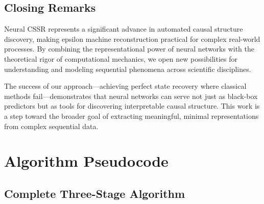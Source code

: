 \documentclass[11pt,a4paper]{report}
\theoremstyle{definition}
\begin{document}
\section{Closing Remarks}
\label{sec:closing}

Neural CSSR represents a significant advance in automated causal structure discovery, making epsilon machine reconstruction practical for complex real-world processes. By combining the representational power of neural networks with the theoretical rigor of computational mechanics, we open new possibilities for understanding and modeling sequential phenomena across scientific disciplines.

The success of our approach—achieving perfect state recovery where classical methods fail—demonstrates that neural networks can serve not just as black-box predictors but as tools for discovering interpretable causal structure. This work is a step toward the broader goal of extracting meaningful, minimal representations from complex sequential data.

\appendix

\chapter{Algorithm Pseudocode}
\label{app:algorithms}

\section{Complete Three-Stage Algorithm}
\end{document}
